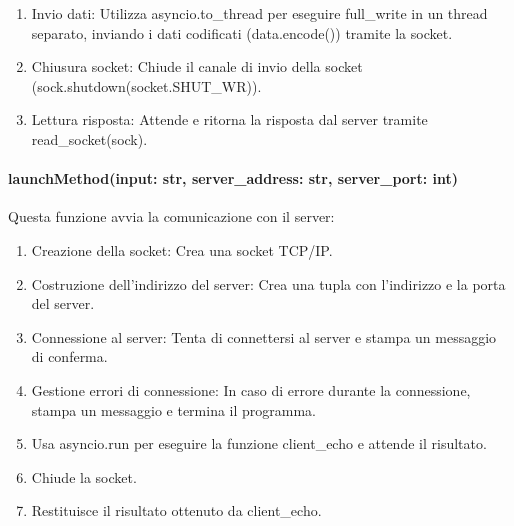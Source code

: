 \documentclass{article}
\begin{document}
\begin{enumerate}
\item Invio dati: Utilizza asyncio.to\_thread per eseguire full\_write in un thread separato, inviando i dati codificati (data.encode()) tramite la socket.
\item Chiusura socket: Chiude il canale di invio della socket (sock.shutdown(socket.SHUT\_WR)).
\item Lettura risposta: Attende e ritorna la risposta dal server tramite read\_socket(sock).
\end{enumerate}

\paragraph{launchMethod(input: str, server\_address: str, server\_port: int)}
Questa funzione avvia la comunicazione con il server:

\begin{enumerate}
    \item Creazione della socket: Crea una socket TCP/IP.
    \item Costruzione dell'indirizzo del server: Crea una tupla con l'indirizzo e la porta del server.
    \item Connessione al server: Tenta di connettersi al server e stampa un messaggio di conferma.
    \item Gestione errori di connessione: In caso di errore durante la connessione, stampa un messaggio e termina il programma.
    \item Usa asyncio.run per eseguire la funzione client\_echo e attende il risultato.
    \item Chiude la socket.
    \item Restituisce il risultato ottenuto da client\_echo.
\end{enumerate}
\end{document}
